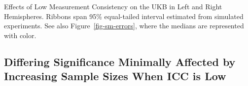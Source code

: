 \documentclass[
  authoryear,
  preprint,
  1p]{elsarticle}
\begin{document}
\begin{sfig}


\caption{\label{sfig-left-right}Effects of Low Measurement Consistency
on the UKB in Left and Right Hemispheres. Ribbons span 95\% equal-tailed
interval estimated from simulated experiments. See also
Figure~\ref{fig-sm-errors}, where the medians are represented with
color.}

\end{sfig}%

\FloatBarrier

\subsection{Differing Significance Minimally Affected by Increasing
Sample Sizes When ICC is Low}\label{sec-min}
\end{document}
